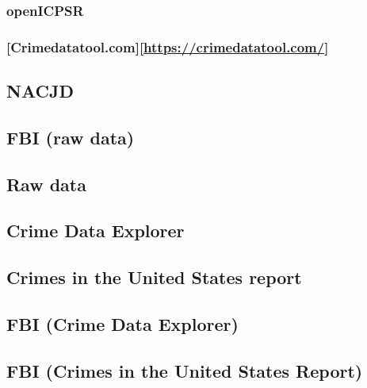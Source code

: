 \documentclass[
  12pt,
  openany]{book}
\begin{document}
\subsubsection{openICPSR}\label{openicpsr}

\subsubsection{\texorpdfstring{{[}Crimedatatool.com{]}{[}\url{https://crimedatatool.com/}{]}}{{[}Crimedatatool.com{]}{[}https://crimedatatool.com/{]}}}\label{crimedatatool.comhttpscrimedatatool.com}

\subsection{NACJD}\label{nacjd}

\subsection{FBI (raw data)}\label{fbi-raw-data}

\subsection{Raw data}\label{raw-data}

\subsection{Crime Data Explorer}\label{crime-data-explorer}

\subsection{Crimes in the United States report}\label{crimes-in-the-united-states-report}

\subsection{FBI (Crime Data Explorer)}\label{fbi-crime-data-explorer}

\subsection{FBI (Crimes in the United States Report)}\label{fbi-crimes-in-the-united-states-report}
\end{document}
